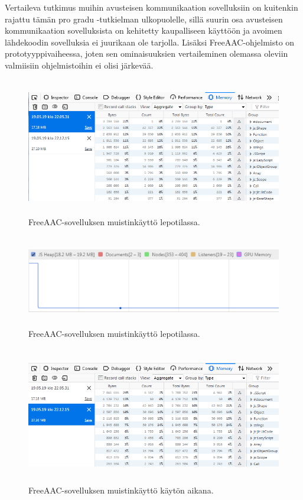 \documentclass[utf8]{gradu3}
\begin{document}
Vertaileva tutkimus muihin avusteisen kommunikaation sovelluksiin on kuitenkin rajattu tämän pro gradu -tutkielman ulkopuolelle, sillä suurin osa avusteisen kommunikaation sovelluksista on kehitetty kaupalliseen käyttöön ja avoimen lähdekoodin sovelluksia ei juurikaan ole tarjolla. Lisäksi FreeAAC-ohjelmisto on prototyyppivaiheessa, joten sen ominaisuuksien vertaileminen olemassa oleviin valmiisiin ohjelmistoihin ei olisi järkevää.

\begin{figure}[h]\centering
  \includegraphics[height=6cm,keepaspectratio]{memory-use-idle}
  \caption[FreeAAC-sovelluksen muistinkäyttö lepotilassa.]
  {FreeAAC-sovelluksen muistinkäyttö lepotilassa.}
  \label{fig:memory-use-idle}
\end{figure}

\begin{figure}[h]\centering
  \includegraphics[height=4cm,keepaspectratio]{chromium-memory-use-idle}
  \caption[FreeAAC-sovelluksen muistinkäyttö lepotilassa graafina.]
  {FreeAAC-sovelluksen muistinkäyttö lepotilassa.}
  \label{fig:chromium-memory-use-idle}
\end{figure}

\begin{figure}[h]\centering
  \includegraphics[height=6cm,keepaspectratio]{memory-use-stress}
  \caption[FreeAAC-sovelluksen muistinkäyttö käytön aikana.]
  {FreeAAC-sovelluksen muistinkäyttö käytön aikana.}
  \label{fig:memory-use-stress}
\end{figure}
\end{document}

